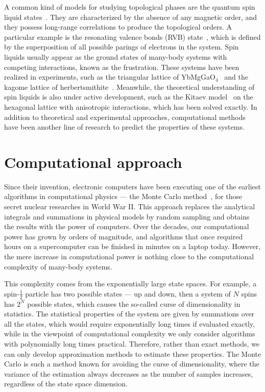 A common kind of models for studying topological phases are the quantum spin liquid states~\cite{balents2010spin, misguich2011quantum, mila2015frustrated}. They are characterized by the absence of any magnetic order, and they possess long-range correlations to produce the topological orders. A particular example is the resonating valence bonds (RVB) state~\cite{anderson1973resonating}, which is defined by the superposition of all possible parings of electrons in the system. Spin liquids usually appear as the ground states of many-body systems with competing interactions, known as the frustration. These systems have been realized in experiments, such as the triangular lattice of YbMgGaO$_4$~\cite{li2015rare} and the kagome lattice of herbertsmithite~\cite{norman2016colloquium}. Meanwhile, the theoretical understanding of spin liquids is also under active development, such as the Kitaev model~\cite{kitaev2006anyons} on the hexagonal lattice with anisotropic interactions, which has been solved exactly. In addition to theoretical and experimental approaches, computational methods have been another line of research to predict the properties of these systems.

\section{Computational approach}

Since their invention, electronic computers have been executing one of the earliest algorithms in computational physics --- the Monte Carlo method~\cite{metropolis1949monte}, for those secret nuclear researches in World War II. This approach replaces the analytical integrals and summations in physical models by random sampling and obtains the results with the power of computers. Over the decades, our computational power has grown by orders of magnitude, and algorithms that once required hours on a supercomputer can be finished in minutes on a laptop today. However, the mere increase in computational power is nothing close to the computational complexity of many-body systems.

This complexity comes from the exponentially large state spaces. For example, a spin-$\frac{1}{2}$ particle has two possible states --- up and down, then a system of $N$ spins has $2^N$ possible states, which causes the so-called curse of dimensionality in statistics. The statistical properties of the system are given by summations over all the states, which would require exponentially long times if evaluated exactly, while in the viewpoint of computational complexity we only consider algorithms with polynomially long times practical. Therefore, rather than exact methods, we can only develop approximation methods to estimate these properties. The Monte Carlo is such a method known for avoiding the curse of dimensionality, where the variance of the estimation always decreases as the number of samples increases, regardless of the state space dimension.

